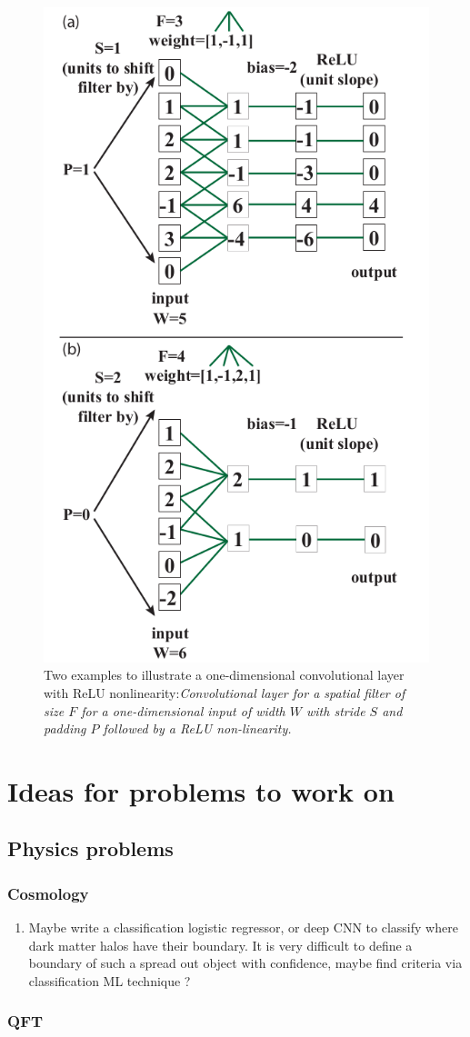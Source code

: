 \begin{figure}[h!]
	\centering
	\includegraphics[width=0.4\linewidth]{gfx/cnnExample}
	\caption{Two examples to illustrate a one-dimensional convolutional layer with ReLU nonlinearity:\itshape Convolutional layer for a spatial filter of size $F$ for a one-dimensional input of width $W$ with stride $S$ and padding $P$ followed by a ReLU non-linearity.}
	\label{fig:cnnExample}
\end{figure}
































\chapter{Ideas for problems to work on}
\section{Physics problems}
\subsection{Cosmology}
\begin{enumerate}
	\item Maybe write a classification logistic regressor, or deep CNN to classify where dark matter halos have their boundary. It is very difficult to define a boundary of such a spread out object with confidence, maybe find criteria via classification ML technique ?
\end{enumerate}
\subsection{QFT}